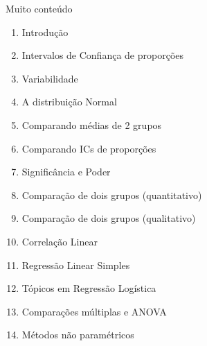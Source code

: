 \documentclass{beamer}
\begin{document}
\begin{frame}{\scriptsize Muito conteúdo}
  \begin{enumerate}
    \tiny
  \item Introdução

    \bigskip
  \item Intervalos de Confiança de proporções

  \item Variabilidade

  \item A distribuição Normal

    \bigskip
  \item Comparando médias de 2 grupos

  \item Comparando ICs de proporções

  \item Significância e Poder

  \item Comparação de dois grupos (quantitativo)

  \item Comparação de dois grupos (qualitativo)

    \bigskip
  \item Correlação Linear

  \item Regressão Linear Simples

  \item Tópicos em Regressão Logística

  \item Comparações múltiplas e ANOVA

    \bigskip
  \item Métodos não paramétricos

  \end{enumerate}
\end{frame}
\end{document}
